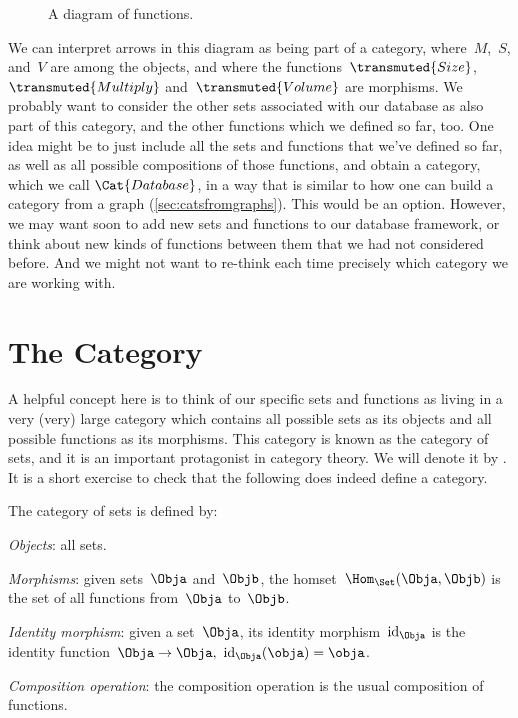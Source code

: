 

\begin{figure}[h!]
  \begin{center}
  \end{center}
  \caption{A diagram of functions. \label{fig:diagram_functions}}
\end{figure}

We can interpret arrows in this diagram as being part of a category, where~$M$,~$S$, and~$V$ are among the objects, and where the functions~$\transmuted{Size}$, $\transmuted{Multiply}$ and~$\transmuted{Volume}$ are morphisms. We probably want to consider the other sets associated with our database as also part of this category, and the other functions which we defined so far, too. One idea might be to just include all the sets and functions that we've defined so far, as well as all possible compositions of those functions, and obtain a category, which we call $\Cat{Database}$, in a way that is similar to how one can build a category from a graph (\cref{sec:catsfromgraphs}). This would be an option. However, we may want soon to add new sets and functions to our database framework, or think about new kinds of functions between them that we had not considered before. And we might not want to re-think each time precisely which category we are working with.

\section{The Category \Set}

A helpful concept here is to think of our specific sets and functions as living in a very (very) large category which contains all possible sets as its objects and all possible functions as its morphisms. This category is known as the category of sets, and it is an important protagonist in category theory. We will denote it by \Set. It is a short exercise to check that the following does indeed define a category.

\begin{ctdefinition}
  The category of sets \iindex{\Set} is defined by:
  \begin{compactenum}
    \item \emph{Objects}: all sets.
    \item \emph{Morphisms}: given sets~$\Obja$ and~$\Objb$, the homset~$\Hom_\Set(\Obja,\Objb)$ is the set of all functions from~$\Obja$ to~$\Objb$.
    \item \emph{Identity morphism}: given a set~$\Obja$, its identity morphism~$\text{id}_\Obja$ is the identity function~$\Obja \to \Obja, \ \text{id}_\Obja(\obja) = \obja$.
    \item \emph{Composition operation}: the composition operation is the usual composition of functions.
  \end{compactenum}
\end{ctdefinition}

